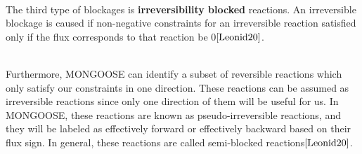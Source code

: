 \documentclass[11pt, a4paper]{article}
\begin{document}
	~\\The third type of blockages is \textbf{irreversibility blocked} reactions. An irreversible blockage is caused if non-negative constraints for an irreversible reaction satisfied only if the flux corresponds to that reaction be 0$\cite{Leonid20}$.

	~\\Furthermore, MONGOOSE can identify a subset of reversible reactions which only satisfy our constraints in one direction. These reactions can be assumed as irreversible reactions since only one direction of them will be useful for us. In MONGOOSE, these reactions are known as pseudo-irreversible reactions, and they will be labeled as effectively forward or effectively backward based on their flux sign. In general, these reactions are called semi-blocked reactions$\cite{Leonid20}$.\\


\end{document}

